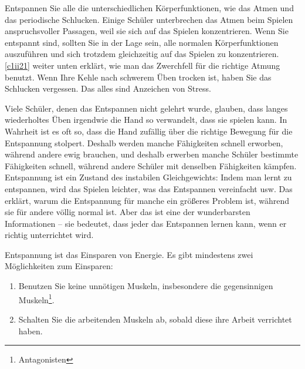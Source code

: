Entspannen Sie alle die unterschiedlichen Körperfunktionen, wie das Atmen und das periodische Schlucken.
Einige Schüler unterbrechen das Atmen beim Spielen anspruchsvoller Passagen, weil sie sich auf das Spielen konzentrieren.
Wenn Sie entspannt sind, sollten Sie in der Lage sein, alle normalen Körperfunktionen auszuführen und sich trotzdem gleichzeitig auf das Spielen zu konzentrieren.
\hyperref[c1ii21]{\autoref{c1ii21}} weiter unten erklärt, wie man das Zwerchfell für die richtige Atmung benutzt.
Wenn Ihre Kehle nach schwerem Üben trocken ist, haben Sie das Schlucken vergessen.
Das alles sind Anzeichen von Stress.

Viele Schüler, denen das Entspannen nicht gelehrt wurde, glauben, dass langes wiederholtes Üben irgendwie die Hand so verwandelt, dass sie spielen kann.
In Wahrheit ist es oft so, dass die Hand zufällig über die richtige Bewegung für die Entspannung stolpert.
Deshalb werden manche Fähigkeiten schnell erworben, während andere ewig brauchen, und deshalb erwerben manche Schüler bestimmte Fähigkeiten schnell, während andere Schüler mit denselben Fähigkeiten kämpfen.
Entspannung ist ein Zustand des instabilen Gleichgewichts: Indem man lernt zu entspannen, wird das Spielen leichter, was das Entspannen vereinfacht usw.
Das erklärt, warum die Entspannung für manche ein größeres Problem ist, während sie für andere völlig normal ist.
Aber das ist eine der wunderbarsten Informationen -- sie bedeutet, dass jeder das Entspannen lernen kann, wenn er richtig unterrichtet wird.

Entspannung ist das Einsparen von Energie.
Es gibt mindestens zwei Möglichkeiten zum Einsparen:

\begin{enumerate}[label={\arabic*.}] 
\item Benutzen Sie keine unnötigen Muskeln, insbesondere die gegensinnigen Muskeln\footnote{Antagonisten}.
\item Schalten Sie die arbeitenden Muskeln ab, sobald diese ihre Arbeit verrichtet haben.
\end{enumerate}

